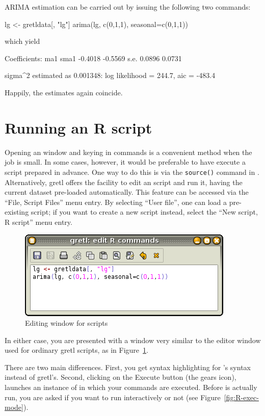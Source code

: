 ARIMA estimation can be carried out by issuing the following two
 commands:
\begin{code}
lg <- gretldata[, "lg"]
arima(lg, c(0,1,1), seasonal=c(0,1,1))
\end{code}

which yield

\begin{code}
Coefficients:
          ma1     sma1
      -0.4018  -0.5569
s.e.   0.0896   0.0731

sigma^2 estimated as 0.001348:  log likelihood = 244.7,  aic = -483.4
\end{code}

Happily, the estimates again coincide.

\section{Running an R script}
\label{sec:R-scripts}

Opening an  window and keying in commands is a convenient
method when the job is small. In some cases, however, it would be
preferable to have  execute a script prepared in advance. 
One way to do this is via the \texttt{source()} command in
.  Alternatively, gretl offers the facility to edit an
 script and run it, having the current dataset pre-loaded
automatically. This feature can be accessed via the ``File, Script
Files'' menu entry.  By selecting ``User file'', one can load a
pre-existing  script; if you want to create a new script
instead, select the ``New script, R script'' menu entry.

\begin{figure}[htbp]
  \centering
  \includegraphics[scale=0.7]{figures/R-edit1}
  \caption{Editing window for  scripts}
  \label{fig:R-edit1}
\end{figure}
In either case, you are presented with a window very similar to
the editor window used for ordinary gretl scripts, as in
Figure~\ref{fig:R-edit1}.

There are two main differences.  First, you get syntax highlighting for
's syntax instead of gretl's. Second, clicking on the
Execute button (the gears icon), launches an instance of  in
which your commands are executed.  Before  is actually run, you
are asked if you want to run  interactively or not (see
Figure~\ref{fig:R-exec-mode}).


